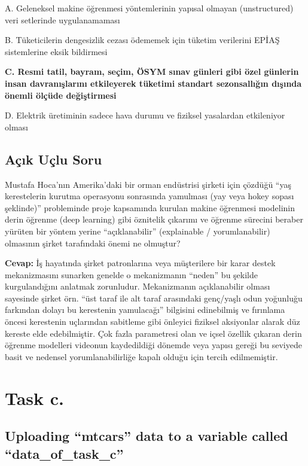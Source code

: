 \documentclass[
  letterpaper,
  DIV=11,
  numbers=noendperiod]{scrartcl}
\begin{document}
A. Geleneksel makine öğrenmesi yöntemlerinin yapısal olmayan
(unstructured) veri setlerinde uygulanamaması

B. Tüketicilerin dengesizlik cezası ödememek için tüketim verilerini
EPİAŞ sistemlerine eksik bildirmesi

\textbf{C. Resmi tatil, bayram, seçim, ÖSYM sınav günleri gibi özel
günlerin insan davranışlarını etkileyerek tüketimi standart
sezonsallığın dışında önemli ölçüde değiştirmesi}

D. Elektrik üretiminin sadece hava durumu ve fiziksel yasalardan
etkileniyor olması

\subsection{Açık Uçlu Soru}\label{auxe7ux131k-uuxe7lu-soru}

Mustafa Hoca'nın Amerika'daki bir orman endüstrisi şirketi için çözdüğü
``yaş kerestelerin kurutma operasyonu sonrasında yamulması (yay veya
hokey sopası şeklinde)'' probleminde proje kapsamında kurulan makine
öğrenmesi modelinin derin öğrenme (deep learning) gibi öznitelik
çıkarımı ve öğrenme sürecini beraber yürüten bir yöntem yerine
``açıklanabilir'' (explainable / yorumlanabilir) olmasının şirket
tarafındaki önemi ne olmuştur?

\textbf{Cevap:} İş hayatında şirket patronlarına veya müşterilere bir
karar destek mekanizmasını sunarken genelde o mekanizmanın ``neden'' bu
şekilde kurgulandığını anlatmak zorunludur. Mekanizmanın açıklanabilir
olması sayesinde şirket örn. ``üst taraf ile alt taraf arasındaki
genç/yaşlı odun yoğunluğu farkından dolayı bu kerestenin yamulacağı''
bilgisini edinebilmiş ve fırınlama öncesi kerestenin uçlarından
sabitleme gibi önleyici fiziksel aksiyonlar alarak düz kereste elde
edebilmiştir. Çok fazla parametresi olan ve içsel özellik çıkaran derin
öğrenme modelleri videonun kaydedildiği dönemde veya yapısı gereği bu
seviyede basit ve nedensel yorumlanabilirliğe kapalı olduğu için tercih
edilmemiştir.

\section{Task c.}\label{task-c.}

\subsection{Uploading ``mtcars'' data to a variable called
``data\_of\_task\_c''}\label{uploading-mtcars-data-to-a-variable-called-data_of_task_c}
\end{document}
